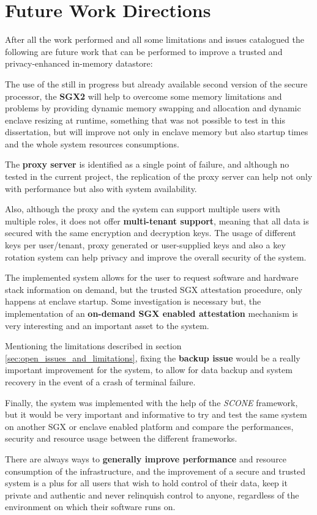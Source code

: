 \section{Future Work Directions}
\label{sec:future_work_directions}

After all the work performed and all some limitations and issues catalogued the following are future work that can be performed to improve a trusted and privacy-enhanced in-memory datastore:

The use of the still in progress but already available second version of the secure processor, the \textbf{\gls{SGX}2} will help to overcome some memory limitations and problems by providing dynamic memory swapping and allocation and dynamic enclave resizing at runtime, something that was not possible to test in this dissertation, but will improve not only in enclave memory but also startup times and the whole system resources consumptions.

The \textbf{proxy server} is identified as a single point of failure, and although no tested in the current project, the replication of the proxy server can help not only with performance but also with system availability.

Also, although the proxy and the system can support multiple users with multiple roles, it does not offer \textbf{multi-tenant support}, meaning that all data is secured with the same encryption and decryption keys. The usage of different keys per user/tenant, proxy generated or user-supplied keys and also a key rotation system can help privacy and improve the overall security of the system.

The implemented system allows for the user to request software and hardware stack information on demand, but the trusted \gls{SGX} attestation procedure, only happens at enclave startup. Some investigation is necessary but, the implementation of an \textbf{on-demand \gls{SGX} enabled attestation} mechanism is very interesting and an important asset to the system.

Mentioning the limitations described in section \ref{sec:open_issues_and_limitations}, fixing the \textbf{backup issue} would be a really important improvement for the system, to allow for data backup and system recovery in the event of a crash of terminal failure.

Finally, the system was implemented with the help of the \textit{SCONE} framework, but it would be very important and informative to try and test the same system on another \gls{SGX} or enclave enabled platform and compare the performances, security and resource usage between the different frameworks.

There are always ways to \textbf{generally improve performance} and resource consumption of the infrastructure, and the improvement of a secure and trusted system is a plus for all users that wish to hold control of their data, keep it private and authentic and never relinquish control to anyone, regardless of the environment on which their software runs on.
